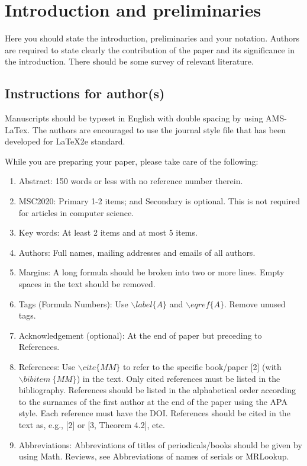 \documentclass[12pt, reqno]{amsart}
\theoremstyle{definition}
\theoremstyle{remark}
\numberwithin{equation}{section}
\begin{document}

\section{Introduction and preliminaries}

\noindent Here you should state the introduction, preliminaries and
your notation. Authors are required to state clearly the
contribution of the paper and its significance in the introduction.
There should be some survey of relevant literature.

\subsection{Instructions for author(s)}

Manuscripts should be typeset in English with double spacing by
using AMS-LaTex. The authors are encouraged to use the journal style
file that has been developed for LaTeX2e standard.

While you are preparing your paper, please take care of the
following:
\begin{enumerate}
\item Abstract: 150 words or less with no reference number therein.\\
\item MSC2020: Primary 1-2 items; and Secondary is optional. This is not required for articles in computer science.\\

\item Key words: At least 2 items and at most 5 items.\\
\item Authors: Full names, mailing addresses and emails of all authors.\\
\item Margins: A long formula should be broken into two or more lines. Empty spaces in the text should be removed.\\
\item Tags (Formula Numbers): Use $\backslash label\{A\}$ and $\backslash eqref\{A\}$. Remove unused tags. \\
\item Acknowledgement (optional): At the end of paper but preceding to References.\\
\item References: Use $\backslash cite\{MM\}$ to refer to the specific book/paper [2] (with $\backslash bibitem~\{MM\}$) in the text. Only cited references must be listed in the bibliography. References should be listed in the alphabetical order according to the surnames of the first author at the end of the paper using the APA style. Each reference must have the DOI.
References should be cited in the text as, e.g., [2] or [3, Theorem 4.2], etc.  \\
\item Abbreviations: Abbreviations of titles of periodicals/books should be given by using Math. Reviews, see Abbreviations of names of serials or MRLookup.

\end{enumerate}
\end{document}
